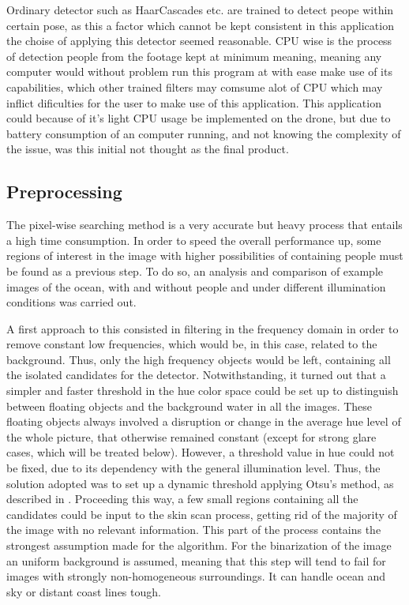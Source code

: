 Ordinary detector such as HaarCascades etc. are trained to detect peope within certain pose, as this a factor which cannot be kept consistent in this application the choise  of applying this detector seemed reasonable. CPU wise is the process of detection people from the footage kept at minimum meaning, meaning any computer would without problem run this program at with ease make use of its capabilities, which other trained filters may comsume alot of CPU which may inflict dificulties for the user to make use of this application.  This application could because of it's light CPU usage be implemented on the drone, but due to battery consumption of an computer running,  and not knowing the complexity of the issue, was this initial not thought as the final product. 


\subsection{Preprocessing}
The pixel-wise searching method is a very accurate but heavy process that entails a high time consumption.
In order to speed the overall performance up, some regions of interest in the image with higher possibilities of containing people must be found as a previous step. To do so, an analysis and comparison of example images of the ocean, with and without people and under different illumination conditions was carried out.  

A first approach to this consisted in filtering in the frequency domain in order to remove constant low frequencies, which would be, in this case, related to the background. Thus, only the high frequency objects would be left, containing all the isolated candidates for the detector.
Notwithstanding, it turned out that a simpler and faster threshold in the hue color space could be set up to distinguish between floating objects and the background water in all the images. 
These floating objects always involved a disruption or change in the average hue level of the whole picture, that otherwise remained constant (except for strong glare cases, which will be treated below).
However, a threshold value in hue could not be fixed, due to its dependency with the general illumination level. 
Thus, the solution adopted was to set up a dynamic threshold applying Otsu's method, as described in \cite{Ref:Otsu}.
Proceeding this way, a few small regions containing all the candidates could be input to the skin scan process, getting rid of the majority of the image with no relevant information. 
This part of the process contains the strongest assumption made for the algorithm. 
For the binarization of the image an uniform background is assumed, meaning that this step will tend to fail for images with strongly non-homogeneous surroundings. 
It can handle ocean and sky or distant coast lines tough. 

